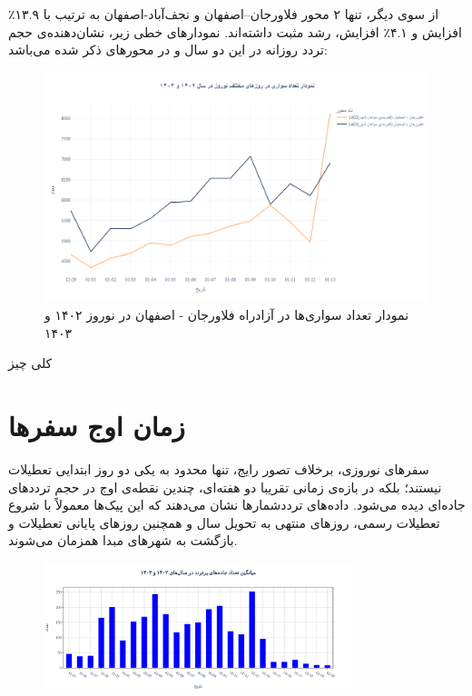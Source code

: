 \documentclass[a4paper, 12pt]{article}
\begin{document}
از سوی دیگر، تنها ۲ محور فلاورجان–اصفهان و نجف‌آباد-اصفهان به ترتیب با ۱۳.۹٪ افزایش و  ۴.۱٪ افزایش، رشد مثبت داشته‌اند. نمودارهای خطی زیر، نشان‌دهنده‌ی حجم تردد روزانه در این دو سال و در محورهای ذکر شده می‌باشد:

\newpage 
\begin{figure}[htbp]
    \centering
    \includegraphics[width=1\textwidth]{compare_213279.png}
    \caption{نمودار تعداد سواری‌ها در آزادراه فلاورجان - اصفهان در نوروز ۱۴۰۲ و ۱۴۰۳}
\end{figure}
کلی چیز

\newpage
\section{زمان اوج سفرها}
سفرهای نوروزی، برخلاف تصور رایج، تنها محدود به یکی دو روز ابتدایی تعطیلات نیستند؛ بلکه در بازه‌ی زمانی تقریبا دو هفته‌ای، چندین نقطه‌ی اوج در حجم ترددهای جاده‌ای دیده می‌شود. داده‌های ترددشمارها نشان می‌دهند که این پیک‌ها معمولاً با شروع تعطیلات رسمی، روزهای منتهی به تحویل سال و همچنین روزهای پایانی تعطیلات و بازگشت به شهرهای مبدا همزمان می‌شوند.

\begin{figure}[htbp]
    \centering
    \includegraphics[width=0.8\textwidth]{peaks-pics/count_mean.png}
\end{figure}
\end{document}

